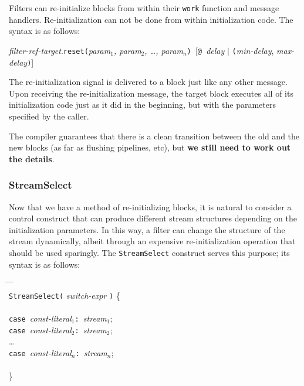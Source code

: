 \documentclass[draft]{article}
\begin{document}
Filters can re-initialize blocks from within their {\tt work} function
and message handlers.  Re-initialization can not be done from within
initialization code.  The syntax is as follows:

\medskip
{\it filter-ref-target}.{\tt reset(}{\it param$_1$, param$_2$, \dots, param$_n$}{\tt) }[{\tt @ }{\it delay} $|$ {\tt (}{\it min-delay}, {\it max-delay}{\tt )}]
\medskip

The re-initialization signal is delivered to a block just like any
other message.  Upon receiving the re-initialization message, the
target block executes all of its initialization code just as it did in
the beginning, but with the parameters specified by the caller.  

The compiler guarantees that there is a clean transition between the
old and the new blocks (as far as flushing pipelines, etc), but {\bf
we still need to work out the details}.

\subsubsection{StreamSelect}
\label{sec:streamselect}

Now that we have a method of re-initializing blocks, it is natural to
consider a control construct that can produce different stream
structures depending on the initialization parameters.  In this way, a
filter can change the structure of the stream dynamically, albeit
through an expensive re-initialization operation that should be used
sparingly.  The {\tt StreamSelect} construct serves this purpose; its
syntax is as follows:

\begin{tabbing}
\hspace{0.2in} \= \hspace{0.2in} \= \hspace{0.2in} \= \hspace{0.2in} \= \\

{\tt StreamSelect(} {\it switch-expr} {\tt )} \{ \\ \\
\> {\tt case }{\it const-literal$_1$}{\tt :  }{\it stream$_1$}; \\
\> {\tt case }{\it const-literal$_2$}{\tt :  }{\it stream$_2$}; \\
\> \dots \\
\> {\tt case }{\it const-literal$_n$}{\tt :  }{\it stream$_{n}$}; \\
 \\
\}
\end{tabbing}
\end{document}
